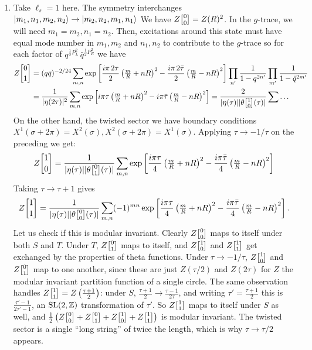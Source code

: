 \documentclass[11pt]{article}
\begin{document}
\begin{enumerate}
	
	\item Take $\ell_s = 1$ here. The symmetry interchanges $\ket{m_1, n_1, m_2, n_2} \to \ket{m_2, n_2, m_1, n_1}$ We have $Z\twist00 = Z(R)^2$. In the $g$-trace, we will need $m_1 = m_2, n_1 = n_2$. Then, excitations around this state must have equal mode number in $m_1, m_2$ and $n_1, n_2$ to contribute to the $g$-trace so for each factor of $q^{\frac12 P_L^2} \, \bar q^{\frac12 P_R^2}$ we have
	\[
	\begin{aligned}
		Z\twist01 &= (q \bar q)^{-2/24} \sum_{m, n} \exp\left[\frac{i \pi \, 2 \tau}{2} \left( \tfrac{m}{R} + n R \right)^2 -  \frac{i \pi \, 2 \bar \tau}{2}  \left( \tfrac{m}{R} - n R \right)^2  \right] \prod_{n'} \frac{1}{1-q^{2n'}} \prod_{m'} \frac1{1-\bar q^{2m'}}\\
		& = \frac{1}{|\eta(2 \tau)|^2}  \sum_{m, n} \exp\left[i \pi \tau \left( \tfrac{m}{R} + n R \right)^2 - i \pi \bar \tau \left( \tfrac{m}{R} - n R \right)^2  \right] = \frac{2}{|\eta(\tau)| |\theta\twist10(\tau)|} \sum \dots
	\end{aligned}
	\]
	On the other hand, the twisted sector we have boundary conditions $X^1(\sigma+2\pi) = X^2(\sigma), X^2(\sigma+2\pi) = X^1(\sigma)$. Applying $\tau \to -1/\tau$ on the preceding we get:
	\[
		Z\twist10 = \frac{1}{|\eta(\tau)| |\theta\twist01(\tau)|} \sum_{m, n}  \exp\left[\frac{i \pi \tau}{4} \left( \tfrac{m}{R} + n R \right)^2 - \frac{i \pi \bar \tau}{4} \left( \tfrac{m}{R} - n R \right)^2  \right] 
	\]
	Taking $\tau \to \tau+1$ gives
	\[
		Z\twist11 = \frac{1}{|\eta(\tau)| |\theta\twist00(\tau)|}\sum_{m, n} (-1)^{mn} \exp\left[\frac{i \pi \tau}{4} \left( \tfrac{m}{R} + n R \right)^2 - \frac{i \pi \bar \tau}{4} \left( \tfrac{m}{R} - n R \right)^2  \right].
	\]
	Let us check if this is modular invariant. Clearly $Z\twist00$ maps to itself under both $S$ and $T$. Under $T$, $Z\twist01$ maps to itself, and $Z\twist10$ and $Z\twist11$ get exchanged by the properties of theta functions. Under $\tau \to -1/\tau$, $Z\twist10$ and $Z\twist01$ map to one another, since these are just $Z(\tau/2)$ and $Z(2\tau)$ for $Z$ the modular invariant partition function of a single circle. The same observation handles $Z\twist11 = Z\left(\frac{\tau+1}{2}\right)$: under $S$, $\frac{\tau+1}{2} \to \frac{\tau - 1}{2 \tau}$, and writing $\tau' = \frac{\tau+1}{2}$ this is $\frac{\tau'-1}{2\tau'-1}$, an $\mathrm{SL}(2, \mathbb{Z})$ transformation of $\tau'$. So $Z\twist11$ maps to itself under $S$ as well, and $\frac12 \left(Z\twist00 + Z\twist01 + Z\twist10 + Z\twist11\right)$ is modular invariant. The twisted sector is a single ``long string'' of twice the length, which is why $\tau \to \tau/2$ appears.
	

\end{enumerate}
\end{document}
